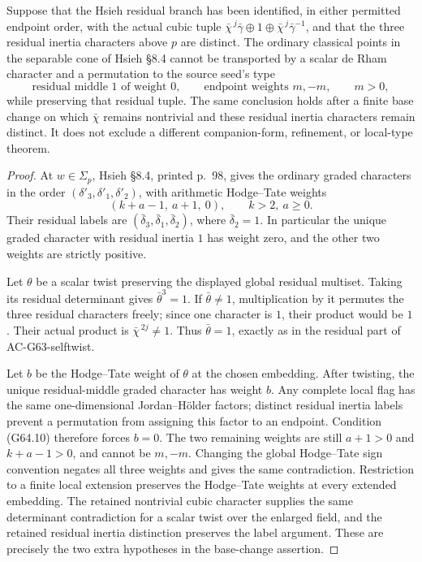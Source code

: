 \begin{proposition}
\label{AC-G64-weight}
Suppose that the Hsieh residual branch has been identified,
in either permitted endpoint order, with the actual cubic
tuple $\bar\chi^{\,j}\bar\gamma\oplus1\oplus
\bar\chi^{\,j}\bar\gamma^{-1}$, and that the three residual
inertia characters above $p$ are distinct.  The ordinary
classical points in the separable cone of Hsieh \S8.4 cannot
be transported by a scalar de Rham character and a permutation
to the source seed's type
\[
       \text{residual middle }1\text{ of weight }0,
             \qquad\text{endpoint weights }m,-m,
             \qquad m>0,                                 \tag{G64.10}
\]
while preserving that residual tuple.  The same conclusion
holds after a finite base change on which $\bar\chi$ remains
nontrivial and these residual inertia characters remain distinct.
It does not exclude a different
companion-form, refinement, or local-type theorem.
\end{proposition}
\begin{proof}
At $w\in\Sigma_p$, Hsieh \S8.4, printed p.~98, gives
the ordinary graded characters in the order
$(\delta'_3,\delta'_1,\delta'_2)$, with arithmetic
Hodge--Tate weights
\[
              (k+a-1,\ a+1,\ 0),\qquad k>2,\ a\ge0.
                                                               \tag{G64.11}
\]
Their residual labels are $(\bar\delta_3,\bar\delta_1,
\bar\delta_2)$, where $\bar\delta_2=1$.
In particular the unique graded character with residual
inertia $1$ has weight zero, and the other two weights are
strictly positive.

Let $\theta$ be a scalar twist preserving the displayed
global residual multiset.  Taking its residual determinant
gives $\bar\theta^3=1$.  If $\bar\theta\ne1$, multiplication
by it permutes the three residual characters freely; since
one character is $1$, their product would be $1$.  Their
actual product is $\bar\chi^{\,2j}\ne1$.  Thus
$\bar\theta=1$, exactly as in the residual part of
AC-G63-selftwist.

Let $b$ be the Hodge--Tate weight of $\theta$ at the chosen
embedding.  After twisting, the unique residual-middle
graded character has weight $b$.  Any complete local flag
has the same one-dimensional Jordan--H\"older factors;
distinct residual inertia labels prevent a permutation from
assigning this factor to an endpoint.  Condition (G64.10)
therefore forces $b=0$.  The two remaining weights are
still $a+1>0$ and $k+a-1>0$, and cannot be $m,-m$.
Changing the global Hodge--Tate sign convention negates
all three weights and gives the same contradiction.
Restriction to a finite local extension preserves the
Hodge--Tate weights at every extended embedding.  The retained
nontrivial cubic character supplies the same determinant
contradiction for a scalar twist over the enlarged field, and
the retained residual inertia distinction preserves the label
argument.  These are precisely the two extra hypotheses in
the base-change assertion.
\end{proof}

